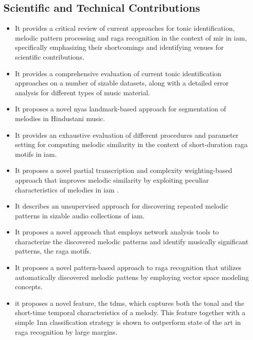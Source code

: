 \subsection*{Scientific and Technical Contributions}

\begin{itemize}
	\item It provides a critical review of current approaches for tonic identification, melodic pattern processing and \gls{raga} recognition in the context of \gls{mir} in \gls{iam}, specifically emphasizing their shortcomings and identifying venues for scientific contributions. 
	\item It provides a comprehensive evaluation of current tonic identification approaches on a number of sizable datasets,  along with a detailed error analysis for different types of music material.
	\item It proposes a novel \gls{nyas} landmark-based approach for segmentation of melodies in Hindustani music.
	\item It provides an exhaustive evaluation of different procedures and parameter setting for computing melodic similarity in the context of short-duration \gls{raga} motifs in \gls{iam}. 
	\item It proposes a novel partial transcription and complexity weighting-based approach that improves melodic similarity by exploiting peculiar characteristics of melodies in \gls{iam} .
	\item It describes an unsupervised approach for discovering repeated melodic patterns in sizable audio collections of \gls{iam}.
	\item It proposes a novel approach that employs network analysis tools to characterize the discovered melodic patterns and identify musically significant patterns, the \gls{raga} motifs.
	\item It proposes a novel pattern-based approach to \gls{raga} recognition that utilizes automatically discovered melodic pattens by employing vector space modeling concepts. 
	\item it proposes a novel feature, the \acrfull{tdms}, which captures both the tonal and the short-time temporal characteristics of a melody. This feature together with a simple \gls{1nn} classification strategy is shown to outperform state of the art in \gls{raga} recognition by large margins. 
\end{itemize}

